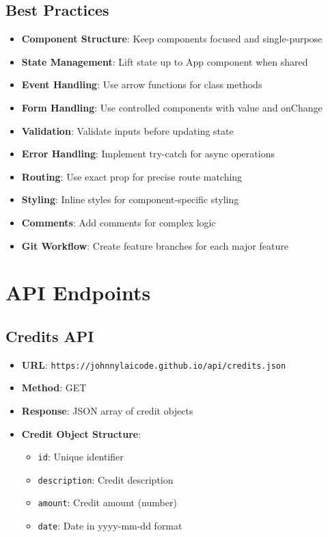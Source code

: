\documentclass[11pt,a4paper]{article}
\begin{document}
\subsection{Best Practices}

\begin{itemize}[leftmargin=*]
    \item \textbf{Component Structure}: Keep components focused and single-purpose
    \item \textbf{State Management}: Lift state up to App component when shared
    \item \textbf{Event Handling}: Use arrow functions for class methods
    \item \textbf{Form Handling}: Use controlled components with value and onChange
    \item \textbf{Validation}: Validate inputs before updating state
    \item \textbf{Error Handling}: Implement try-catch for async operations
    \item \textbf{Routing}: Use exact prop for precise route matching
    \item \textbf{Styling}: Inline styles for component-specific styling
    \item \textbf{Comments}: Add comments for complex logic
    \item \textbf{Git Workflow}: Create feature branches for each major feature
\end{itemize}

\section{API Endpoints}

\subsection{Credits API}
\begin{itemize}[leftmargin=*]
    \item \textbf{URL}: \texttt{https://johnnylaicode.github.io/api/credits.json}
    \item \textbf{Method}: GET
    \item \textbf{Response}: JSON array of credit objects
    \item \textbf{Credit Object Structure}:
        \begin{itemize}
            \item \texttt{id}: Unique identifier
            \item \texttt{description}: Credit description
            \item \texttt{amount}: Credit amount (number)
            \item \texttt{date}: Date in yyyy-mm-dd format
        \end{itemize}
\end{itemize}
\end{document}
